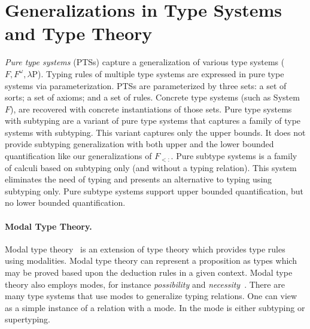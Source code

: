 



\section{Generalizations in Type Systems and Type Theory}

\emph{Pure type systems} (PTSs)
\citep{van1993checking,mckinna1993pure,adams2006pure,jutting1993typing,severi1994pure,zwanenburg1999pure}
capture a generalization of various type systems ($F,
F^{\omega}, {\lambda}$P). Typing rules of multiple type systems are
expressed in pure type systems via parameterization.
PTSs are parameterized by three sets: a set of sorts; a set of axioms;
and a set of rules. Concrete type systems (such as System $F$),
are recovered with concrete instantiations of those sets.
Pure type systems with subtyping
\citep{zwanenburg1999pure} are a variant of pure type systems
that captures a family of type systems with subtyping. This
variant captures only the upper bounds. It does not provide subtyping
generalization with both upper and the lower bounded quantification
like our \nameduo generalizations of $F_{<:}$.
Pure subtype systems \citep{hutchins2010pure}
is a family of calculi based on subtyping only (and without a typing
relation). This system eliminates the need of typing and presents an
alternative to typing using subtyping only.
Pure subtype systems support upper bounded quantification, but no lower
bounded quantification.

\paragraph{Modal Type Theory.}
Modal type theory~\citep{nanevski2008contextual}
is an extension of type theory which provides type
rules using modalities. Modal type
theory can represent a proposition as
types which may be proved based upon the deduction rules in a given
context. Modal type theory also employs modes, for instance \emph{possibility} and 
\emph{necessity}~\citep{simpson1994proof, nanevski2008contextual}.
There are many type systems that use modes to generalize
typing relations. One can view \nameduo as a simple instance of a
relation with a mode. In \nameduo the mode is either subtyping or
supertyping.

